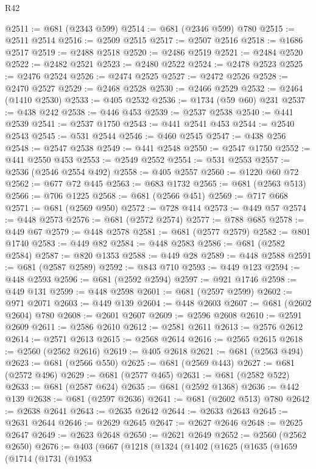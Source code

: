 \begin{lexlean}{R42}
\begin{coremodule}
@2511 := @681 (@2343 @599)
@2514 := @681 (@2346 @599) @780
@2515 := @2511 @2514
@2516 := @2509 @2515
@2517 := @2507 @2516
@2518 := @1686 @2517
@2519 := @2488 @2518
@2520 := @2486 @2519
@2521 := @2484 @2520
@2522 := @2482 @2521
@2523 := @2480 @2522
@2524 := @2478 @2523
@2525 := @2476 @2524
@2526 := @2474 @2525
@2527 := @2472 @2526
@2528 := @2470 @2527
@2529 := @2468 @2528
@2530 := @2466 @2529
@2532 := @2464 (@1410 @2530)
@2533 := @405 @2532
@2536 := @1734 (@59 @60) @231
@2537 := @438 @242
@2538 := @446 @453
@2539 := @2537 @2538
@2540 := @441 @2539
@2541 := @2537 @1750
@2543 := @441 @2541 @453
@2544 := @2540 @2543
@2545 := @531 @2544
@2546 := @460 @2545
@2547 := @438 @256
@2548 := @2547 @2538
@2549 := @441 @2548
@2550 := @2547 @1750
@2552 := @441 @2550 @453
@2553 := @2549 @2552
@2554 := @531 @2553
@2557 := @2536 (@2546 @2554 @492)
@2558 := @405 @2557
@2560 := @1220 @60 @72
@2562 := @677 @72 @445
@2563 := @683 @1732
@2565 := @681 (@2563 @513)
@2566 := @706 @1225
@2568 := @681 (@2566 @451)
@2569 := @717 @668
@2571 := @681 (@2569 @950)
@2572 := @728 @414
@2573 := @449 @57
@2574 := @448 @2573
@2576 := @681 (@2572 @2574)
@2577 := @788 @685
@2578 := @449 @67
@2579 := @448 @2578
@2581 := @681 (@2577 @2579)
@2582 := @801 @1740
@2583 := @449 @82
@2584 := @448 @2583
@2586 := @681 (@2582 @2584)
@2587 := @820 @1353
@2588 := @449 @28
@2589 := @448 @2588
@2591 := @681 (@2587 @2589)
@2592 := @843 @710
@2593 := @449 @123
@2594 := @448 @2593
@2596 := @681 (@2592 @2594)
@2597 := @921 @1746
@2598 := @449 @131
@2599 := @448 @2598
@2601 := @681 (@2597 @2599)
@2602 := @971 @2071
@2603 := @449 @139
@2604 := @448 @2603
@2607 := @681 (@2602 @2604) @780
@2608 := @2601 @2607
@2609 := @2596 @2608
@2610 := @2591 @2609
@2611 := @2586 @2610
@2612 := @2581 @2611
@2613 := @2576 @2612
@2614 := @2571 @2613
@2615 := @2568 @2614
@2616 := @2565 @2615
@2618 := @2560 (@2562 @2616)
@2619 := @405 @2618
@2621 := @681 (@2563 @494)
@2623 := @681 (@2566 @550)
@2625 := @681 (@2569 @443)
@2627 := @681 (@2572 @496)
@2629 := @681 (@2577 @465)
@2631 := @681 (@2582 @522)
@2633 := @681 (@2587 @624)
@2635 := @681 (@2592 @1368)
@2636 := @442 @139
@2638 := @681 (@2597 @2636)
@2641 := @681 (@2602 @513) @780
@2642 := @2638 @2641
@2643 := @2635 @2642
@2644 := @2633 @2643
@2645 := @2631 @2644
@2646 := @2629 @2645
@2647 := @2627 @2646
@2648 := @2625 @2647
@2649 := @2623 @2648
@2650 := @2621 @2649
@2652 := @2560 (@2562 @2650)
@2676 := @403
    (@667
      (@1218
        (@1324
          (@1402
            (@1625
              (@1635
                (@1659
                  (@1714
                    (@1731
                      (@1953

\end{coremodule}
\end{lexlean}
